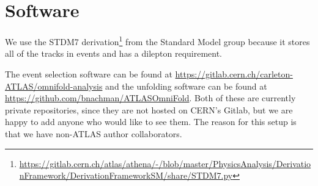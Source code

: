 \documentclass[NOTE, atlasdraft=true, texlive=2016, UKenglish]{\ATLASLATEXPATH atlasdoc}
\begin{document}
\section{Software}

We use the STDM7 derivation\footnote{\url{https://gitlab.cern.ch/atlas/athena/-/blob/master/PhysicsAnalysis/DerivationFramework/DerivationFrameworkSM/share/STDM7.py}} from the Standard Model group because it stores all of the tracks in events and has a dilepton requirement.

The event selection software can be found at \url{https://gitlab.cern.ch/carleton-ATLAS/omnifold-analysis} and the unfolding software can be found at \url{https://github.com/bnachman/ATLASOmniFold}.  Both of these are currently private repositories, since they are not hosted on CERN's Gitlab, but we are happy to add anyone who would like to see them.  The reason for this setup is that we have non-ATLAS author collaborators.


\clearpage


\clearpage


\clearpage


\clearpage


\clearpage



\clearpage


\clearpage




\end{document}

